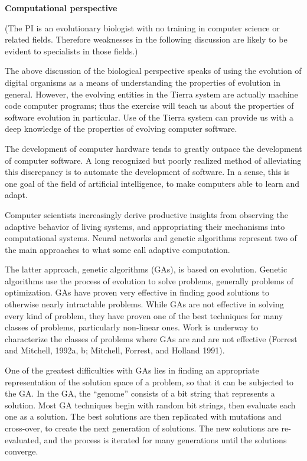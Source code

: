 {\bf Computational perspective}
\eXP

(The PI is an evolutionary biologist with no training in computer science or
related fields.  Therefore weaknesses in the following discussion are likely
to be evident to specialists in those fields.)

The above discussion of the biological perspective speaks of using the
evolution of digital organisms as a means of understanding the properties
of evolution in general.  However, the evolving entities in the Tierra
system are actually machine code computer programs; thus the exercise will
teach us about the properties of software evolution in particular.
Use of the Tierra system can provide us with a deep knowledge of
the properties of evolving computer software.

The development of computer hardware tends to greatly outpace the development
of computer software.  A long recognized but poorly realized method of
alleviating this discrepancy is to automate the development of software.
In a sense, this is one goal of the field of artificial intelligence, to
make computers able to learn and adapt.

Computer scientists increasingly derive productive insights from observing
the adaptive behavior of living systems, and appropriating their mechanisms
into computational systems.  Neural networks and genetic algorithms represent
two of the main approaches to what some call adaptive computation.

The latter approach, genetic algorithms (GAs), is based on evolution.  Genetic
algorithms use the process of evolution to solve problems, generally
problems of optimization.  GAs have proven very effective in finding good
solutions to otherwise nearly intractable problems.  While GAs are not
effective in solving every kind of problem, they have proven one of the
best techniques for many classes of problems, particularly non-linear
ones.  Work is underway to characterize the classes of problems where
GAs are and are not effective (Forrest and Mitchell, 1992a, b; Mitchell,
Forrest, and Holland 1991).

One of the greatest difficulties with GAs lies in finding an appropriate
representation of the solution space of a problem, so that it can be
subjected to the GA.  In the GA, the ``genome'' consists of a bit string
that represents a solution.  Most GA techniques begin with random bit
strings, then evaluate each one as a solution.  The best solutions are
then replicated with mutations and cross-over, to create the next generation
of solutions.  The new solutions are re-evaluated, and the process is
iterated for many generations until the solutions converge.

